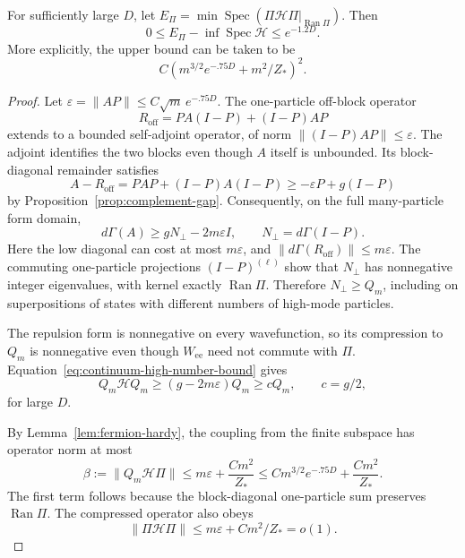 \begin{lemma}
\label{lem:continuum-elimination}
For sufficiently large \(D\), let
\(E_\Pi=\min\operatorname{Spec}
(\Pi\mathcal H\Pi|_{\operatorname{Ran}\Pi})\).
Then
\begin{equation}
 0\le E_\Pi-\inf\operatorname{Spec}\mathcal H
 \le e^{-1.2D}.
 \label{eq:continuum-leakage-error}
\end{equation}
More explicitly, the upper bound can be taken to be
\[
 C\left(m^{3/2}e^{-.75D}+m^2/Z_*\right)^2.
\]
\end{lemma}

\begin{proof}
Let \(\varepsilon=\|AP\|\le C\sqrt m\,e^{-.75D}\).
The one-particle off-block operator
\[
 R_{\mathrm{off}}=PA(I-P)+(I-P)AP
\]
extends to a bounded self-adjoint operator, of norm
\(\|(I-P)AP\|\le\varepsilon\).  The adjoint identifies the two
blocks even though \(A\) itself is unbounded.
Its block-diagonal remainder satisfies
\[
 A-R_{\mathrm{off}}
 =PAP+(I-P)A(I-P)\ge-\varepsilon P+g(I-P)
\]
by Proposition~\ref{prop:complement-gap}.  Consequently, on the
full many-particle form domain,
\begin{equation}
 d\Gamma(A)\ge gN_\perp-2m\varepsilon I,
 \qquad N_\perp=d\Gamma(I-P).
 \label{eq:continuum-high-number-bound}
\end{equation}
Here the low diagonal can cost at most \(m\varepsilon\), and
\(\|d\Gamma(R_{\mathrm{off}})\|\le m\varepsilon\).
The commuting one-particle projections \((I-P)^{(\ell)}\)
show that \(N_\perp\) has nonnegative integer eigenvalues,
with kernel exactly \(\operatorname{Ran}\Pi\).  Therefore
\(N_\perp\ge Q_m\), including on superpositions of states
with different numbers of high-mode particles.

The repulsion form is nonnegative on every wavefunction,
so its compression to \(Q_m\) is nonnegative even though
\(W_{\mathrm{ee}}\) need not commute with \(\Pi\).
Equation~\eqref{eq:continuum-high-number-bound} gives
\begin{equation}
 Q_m\mathcal H Q_m\ge(g-2m\varepsilon)Q_m
 \ge cQ_m,\qquad c=g/2,
 \label{eq:continuum-many-body-gap}
\end{equation}
for large \(D\).

By Lemma~\ref{lem:fermion-hardy}, the coupling from the finite
subspace has operator norm at most
\begin{equation}
 \beta:=\|Q_m\mathcal H\Pi\|
 \le m\varepsilon+\frac{Cm^2}{Z_*}
 \le Cm^{3/2}e^{-.75D}+\frac{Cm^2}{Z_*}.
 \label{eq:continuum-coupling}
\end{equation}
The first term follows because the block-diagonal one-particle
sum preserves \(\operatorname{Ran}\Pi\).  The compressed
operator also obeys
\[
 \|\Pi\mathcal H\Pi\|\le m\varepsilon+Cm^2/Z_*=o(1).
\]


\end{proof}
